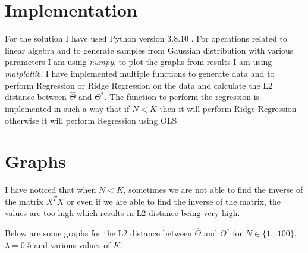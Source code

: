 \documentclass{article}
\begin{document}
\thispagestyle{firstpage}


\section{Implementation}

For the solution I have used Python version 3.8.10 . For operations related to linear algebra and to generate samples from Gaussian distribution with various parameters I am using \emph{numpy}, to plot the graphs from results I am using \emph{matplotlib}. I have implemented multiple functions to generate data and to perform Regression or Ridge Regression on the data and calculate the L2 distance between $\hat{\Theta}$ and $\Theta^{*}$. The function to perform the regression is implemented in such a way that if $N<K$ then it will perform Ridge Regression otherwise it will perform Regression using OLS.

\section{Graphs}

I have noticed that when $N<K$, sometimes we are not able to find the inverse of the matrix $X^{T}X$ or even if we are able to find the inverse of the matrix, the values are too high which results in L2 distance being very high. 

Below are some graphs for the L2 distance between $\hat{\Theta}$ and $\Theta^{*}$ for $N \in \{1 \dots 100\}$, $\lambda = 0.5$ and various values of $K$.
\end{document}
